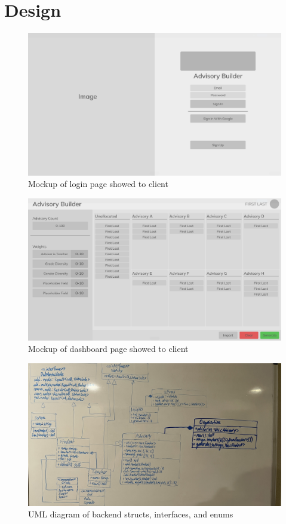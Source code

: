\documentclass{paper}
\begin{document}
\section{Design}
\label{sec:design}
\begin{figure}
  \includegraphics[width=\linewidth]{Login-Mockup}
  \caption{Mockup of login page showed to client}
  \label{design:login}
\end{figure}
\begin{figure}
  \includegraphics[width=\linewidth]{Dashboard-Mockup}
  \caption{Mockup of dashboard page showed to client}
  \label{design:dashboard}
\end{figure}
\begin{figure}
  \includegraphics[width=\linewidth]{UML}
  \caption{UML diagram of backend structs, interfaces, and enums}
  \label{design:uml}
\end{figure}
\end{document}
